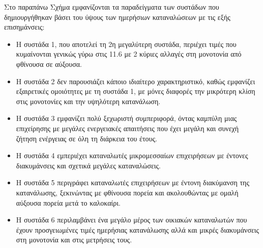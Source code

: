 \par Στο παραπάνω Σχήμα εμφανίζονται τα παραδείγματα των συστάδων που δημιουργήθηκαν βάσει του ύψους των ημερήσιων καταναλώσεων με τις εξής επισημάνσεις:
\begin{itemize}
\item Η συστάδα 1, που αποτελεί τη 2η μεγαλύτερη συστάδα, περιέχει τιμές που κυμαίνονται γενικώς γύρω στις 11.6  με 2 κύριες αλλαγές στη μονοτονία από φθίνουσα σε αύξουσα.
\item Η συστάδα 2 δεν παρουσιάζει κάποιο ιδιαίτερο χαρακτηριστικό, καθώς εμφανίζει εξαιρετικές ομοιότητες με τη συστάδα 1, με μόνες διαφορές την μικρότερη κλίση στις μονοτονίες και την υψηλότερη κατανάλωση.
\item Η συστάδα 3 εμφανίζει πολύ ξεχωριστή συμπεριφορά, όντας καμπύλη μιας επιχείρησης με μεγάλες ενεργειακές απαιτήσεις που έχει μεγάλη και συνεχή ζήτηση ενέργειας σε όλη τη διάρκεια του έτους. 
\item Η συστάδα 4 εμπεριέχει καταναλωτές μικρομεσσαίων επιχειρήσεων με έντονες διακυμάνσεις και σχετικά μεγάλες καταναλώσεις.
\item Η συστάδα 5 περιγράφει καταναλωτές επιχειρήσεων με έντονη διακύμανση της κατανάλωσης, ξεκινώντας με φθίνουσα πορεία και ακολουθώντας με ομαλή αύξουσα πορεία μετά το καλοκαίρι.
\item Η συστάδα 6 περιλαμβάνει ένα μεγάλο μέρος των οικιακών καταναλωτών που έχουν προσγειωμένες τιμές ημερήσιας κατανάλωσης αλλά και μικρές διακυμάνσεις στη μονοτονία και στις μετρήσεις τους.
\end{itemize}
